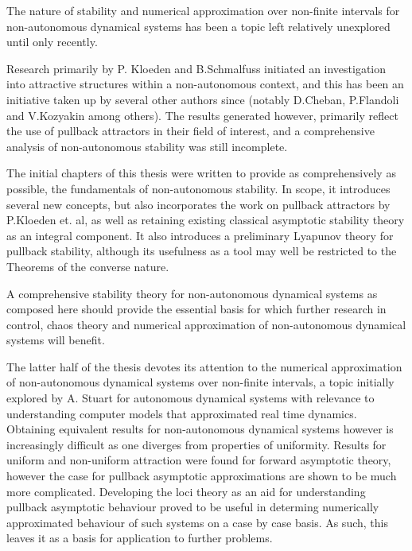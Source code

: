 
The nature of stability and numerical approximation over non-finite intervals
for non-autonomous dynamical systems has been a topic left relatively unexplored
until only recently.

Research primarily by P. Kloeden and B.Schmalfuss initiated an investigation
into attractive structures within a non-autonomous context, and this has been
an initiative taken up by several other authors since (notably D.Cheban,
P.Flandoli and V.Kozyakin among others). The results generated however,
primarily reflect the use of pullback attractors in their field of interest,
and a comprehensive analysis of non-autonomous stability was still incomplete.

The initial chapters of this thesis were written to provide as comprehensively
as possible, the fundamentals of non-autonomous stability.  In scope, it
introduces several new concepts, but also incorporates the work on pullback
attractors by P.Kloeden et. al, as well as retaining existing classical
asymptotic stability theory as an integral component. It also introduces a
preliminary Lyapunov theory for pullback stability, although its usefulness as a
tool may well be restricted to the Theorems of the converse nature.

A comprehensive stability theory for non-autonomous dynamical
systems as composed here should  provide the essential basis for which further
research in control, chaos theory and numerical approximation of non-autonomous
dynamical systems will benefit.


The latter half of the thesis devotes its attention to the numerical
approximation of non-autonomous dynamical systems over non-finite intervals, a
topic initially explored by A. Stuart for autonomous dynamical systems with
relevance to understanding computer models that approximated real time dynamics.
Obtaining equivalent results for non-autonomous dynamical systems however is
increasingly difficult as one diverges from properties of uniformity. Results
for uniform and non-uniform attraction were found for forward asymptotic theory,
however the case for pullback asymptotic approximations are shown to be much
more complicated.  Developing the loci theory as an aid for understanding
pullback asymptotic behaviour proved to be useful in determing
numerically approximated behaviour of such systems on a case by case
basis. As such, this leaves  it as a basis for application to further
problems.


\endinput
